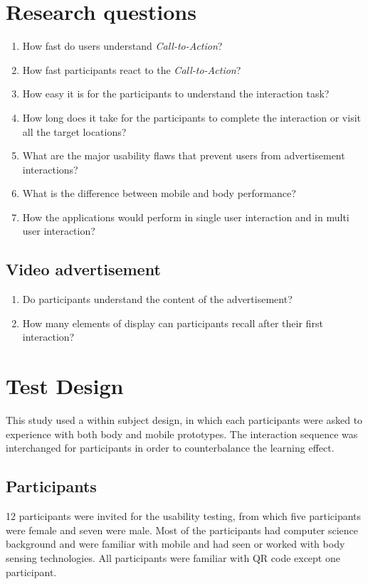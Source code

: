 \section{Research questions}

\begin{enumerate}
\item   How fast do users understand \emph{Call-to-Action}?
\item   How fast participants react to the \emph{Call-to-Action}?
\item   How easy it is for the participants to understand the interaction task?
\item   How long does it take for the participants to complete the interaction or visit all the target locations?
\item   What are the major usability flaws that prevent users from advertisement interactions?
\item   What is the difference between mobile and body performance?
\item   How the applications would perform in single user interaction and in multi user interaction?

\end{enumerate}

\subsection{Video advertisement}
\begin{enumerate}
\item   Do participants understand the content of the advertisement?
\item   How many elements of display can participants recall after their first interaction?
\end{enumerate}


\section{Test Design}
This study used a within subject design, in which each participants were asked to experience with both body and mobile prototypes. The interaction sequence was interchanged for participants in order to counterbalance the learning effect.

\subsection {Participants}
12 participants were invited for the usability testing, from which five participants were female and seven were male. Most of the participants had computer science background and were familiar with mobile and had seen or worked with body sensing technologies. All participants were familiar with QR code except one participant. 

